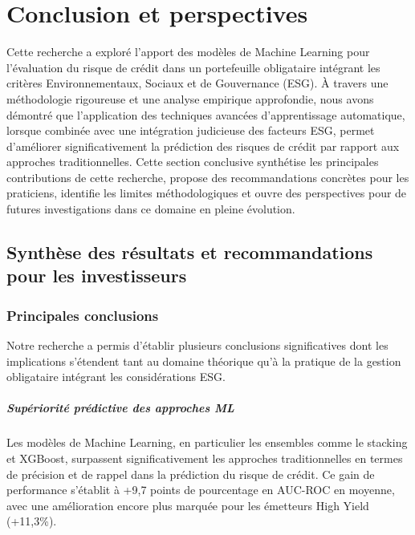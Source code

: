 \chapter*{Conclusion et perspectives}

Cette recherche a exploré l'apport des modèles de Machine Learning pour l'évaluation du risque de crédit dans un portefeuille obligataire intégrant les critères Environnementaux, Sociaux et de Gouvernance (ESG). À travers une méthodologie rigoureuse et une analyse empirique approfondie, nous avons démontré que l'application des techniques avancées d'apprentissage automatique, lorsque combinée avec une intégration judicieuse des facteurs ESG, permet d'améliorer significativement la prédiction des risques de crédit par rapport aux approches traditionnelles. Cette section conclusive synthétise les principales contributions de cette recherche, propose des recommandations concrètes pour les praticiens, identifie les limites méthodologiques et ouvre des perspectives pour de futures investigations dans ce domaine en pleine évolution.

\section*{Synthèse des résultats et recommandations pour les investisseurs}

\subsection*{Principales conclusions}

Notre recherche a permis d'établir plusieurs conclusions significatives dont les implications s'étendent tant au domaine théorique qu'à la pratique de la gestion obligataire intégrant les considérations ESG.

\paragraph{Supériorité prédictive des approches ML} 
Les modèles de Machine Learning, en particulier les ensembles comme le stacking et XGBoost, surpassent significativement les approches traditionnelles en termes de précision et de rappel dans la prédiction du risque de crédit. Ce gain de performance s'établit à +9,7 points de pourcentage en AUC-ROC en moyenne, avec une amélioration encore plus marquée pour les émetteurs High Yield (+11,3\%).

